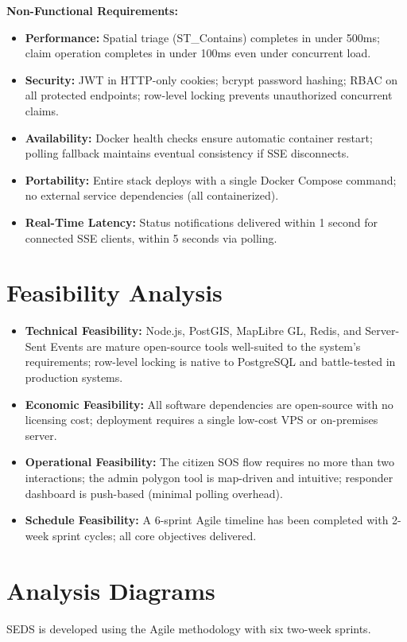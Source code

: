 \textbf{Non-Functional Requirements:}
\begin{itemize}
  \item \textbf{Performance:} Spatial triage (ST\_Contains) completes in under 500ms; claim operation completes in under 100ms even under concurrent load.
  \item \textbf{Security:} JWT in HTTP-only cookies; bcrypt password hashing; RBAC on all protected endpoints; row-level locking prevents unauthorized concurrent claims.
  \item \textbf{Availability:} Docker health checks ensure automatic container restart; polling fallback maintains eventual consistency if SSE disconnects.
  \item \textbf{Portability:} Entire stack deploys with a single Docker Compose command; no external service dependencies (all containerized).
  \item \textbf{Real-Time Latency:} Status notifications delivered within 1 second for connected SSE clients, within 5 seconds via polling.
\end{itemize}

\section{Feasibility Analysis}
\begin{itemize}
  \item \textbf{Technical Feasibility:} Node.js, PostGIS, MapLibre GL, Redis, and Server-Sent Events are mature open-source tools well-suited to the system's requirements; row-level locking is native to PostgreSQL and battle-tested in production systems.
  \item \textbf{Economic Feasibility:} All software dependencies are open-source with no licensing cost; deployment requires a single low-cost VPS or on-premises server.
  \item \textbf{Operational Feasibility:} The citizen SOS flow requires no more than two interactions; the admin polygon tool is map-driven and intuitive; responder dashboard is push-based (minimal polling overhead).
  \item \textbf{Schedule Feasibility:} A 6-sprint Agile timeline has been completed with 2-week sprint cycles; all core objectives delivered.
\end{itemize}

\section{Analysis Diagrams}
SEDS is developed using the Agile methodology with six two-week sprints.

